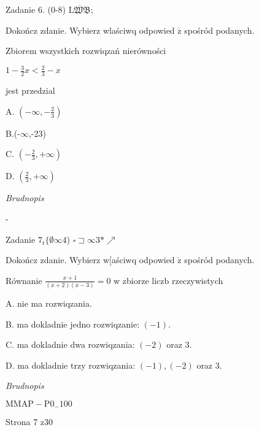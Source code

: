 \documentclass[a4paper,12pt]{article}
\begin{document}
Zadanie 6. (0-8) $\overline{\mathrm{L}\mathfrak{W}\mathfrak{B}}$;

Dokończ zdanie. Wybierz wlaściwq odpowied $\acute{\mathrm{z}}$ spośród podanych.

Zbiorem wszystkich rozwiqzań nierówności

$1-\displaystyle \frac{3}{2}x<\frac{2}{3}-x$

jest przedzial

A. $(-\displaystyle \infty,-\frac{2}{3})$

B.(-$\infty$,-23)

C. $(-\displaystyle \frac{2}{3},+\infty)$

D. $(\displaystyle \frac{2}{3},+\infty)$

{\it Brudnopis}

-

Zadanie $7_{\mathrm{r}}\{\emptyset\infty 4$) $\square \sqsupset\infty 3*\nearrow$

Dokończ zdanie. Wybierz w[aściwq odpowied $\acute{\mathrm{z}}$ spośród podanych.

Równanie $\displaystyle \frac{x+1}{(x+2)(x-3)}=0$ w zbiorze liczb rzeczywistych

A. nie ma rozwiqzania.

B. ma dokladnie jedno rozwiqzanie: $(-1).$

C. ma dokladnie dwa rozwiqzania: $(-2)$ oraz 3.

D. ma dokladnie trzy rozwiqzania: $(-1), (-2)$ oraz 3.

{\it Brudnopis}

$\mathrm{M}\mathrm{M}\mathrm{A}\mathrm{P}-\mathrm{P}0_{-}100$

Strona 7 z30
\end{document}

